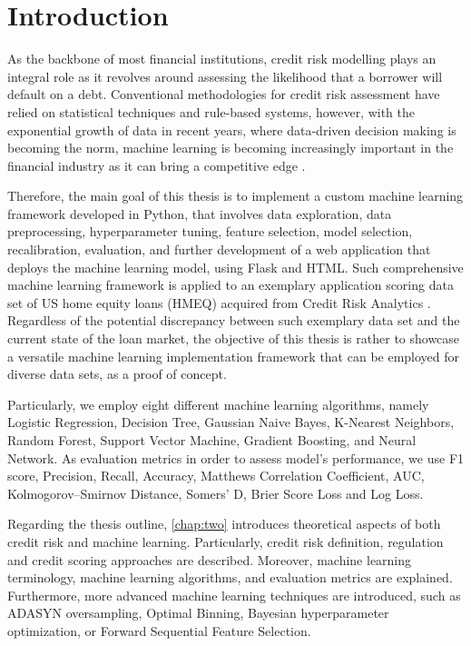 \chapter{Introduction}
\label{chap:one}

As the backbone of most financial institutions, credit risk modelling plays an integral role as it revolves around assessing the likelihood that a borrower will default on a debt.
Conventional methodologies for credit risk assessment have relied on statistical techniques and rule-based systems, however, with the exponential growth of data in recent years, where data-driven decision making is becoming the norm, machine learning is becoming increasingly important in the financial industry as it can bring a competitive edge \citep{PwC2023}.


Therefore, the main goal of this thesis is to implement a custom machine learning framework developed in Python, that involves data exploration, data preprocessing, hyperparameter tuning, feature selection, model selection, recalibration, evaluation, and further development of a web application that deploys the machine learning model, using Flask and HTML.
Such comprehensive machine learning framework is applied to an exemplary application scoring data set of US home equity loans (HMEQ) acquired from Credit Risk Analytics \citep{baesens2016credit}.
Regardless of the potential discrepancy between such exemplary data set and the current state of the loan market, the objective of this thesis is rather to showcase a versatile machine learning implementation framework that can be employed for diverse data sets, as a proof of concept.



Particularly, we employ eight different machine learning algorithms, namely Logistic Regression, Decision Tree, Gaussian Naive Bayes, K-Nearest Neighbors, Random Forest, Support Vector Machine, Gradient Boosting, and Neural Network.
As evaluation metrics in order to assess model's performance, we use F1 score, Precision, Recall, Accuracy, Matthews Correlation Coefficient, AUC, Kolmogorov--Smirnov Distance, Somers' D, Brier Score Loss and Log Loss.



Regarding the thesis outline, \autoref{chap:two} introduces theoretical aspects of both credit risk and machine learning. Particularly, credit risk definition, regulation and credit scoring approaches are described. Moreover, machine learning terminology, machine learning algorithms, and evaluation metrics are explained.
Furthermore, more advanced machine learning techniques are introduced, such as ADASYN oversampling, Optimal Binning, Bayesian hyperparameter optimization, or Forward Sequential Feature Selection.


